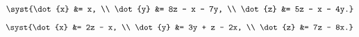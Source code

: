 \begin{multicols}{3}
\begin{enumtasks}
			\item \( \syst{\dot{x} &= x, \\ \dot{y} &= 8z - x - 7y, \\ \dot{z} &= 5z - x - 4y.} \) %
			\item \( \syst{\dot{x} &= 2z - x, \\ \dot{y} &= 3y + z - 2x, \\ \dot{z} &= 7z - 8x.} \) %

\end{enumtasks}
\end{multicols}
